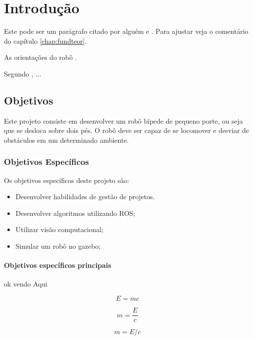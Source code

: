 \chapter{Introdução}
\label{chap:intro}

Este pode ser um parágrafo citado por alguém \cite{Barabasi2003-1} e \cite{barabasi2003linked}.
Para ajustar veja o comentário do capítulo \ref{chap:fundteor}.

As orientações do robô \cite{aperea-1}.

Segundo , ...

\section{Objetivos}
\label{sec:obj}
Este projeto consiste em desenvolver um robô bípede de pequeno porte, ou seja que se desloca sobre dois pés. O robô deve ser capaz de se locomover e desviar de obstáculos em um determinado ambiente. 

\subsection{Objetivos Específicos}
\label{ssec:objesp}
Os objetivos específicos deste projeto são:
\begin{itemize}
      \item Desenvolver habilidades de gestão de projetos.
      \item Desenvolver algoritmos utilizando ROS;
      \item Utilizar visão computacional;
      \item Simular um robô no gazebo;
  \end{itemize}

\subsubsection*{Objetivos específicos principais}
\label{sssec:obj-principais}
ok vendo Aqui


\begin{equation}
  E=mc
\end{equation}


\begin{equation*}
  m=\frac{E}{c}
\end{equation*}

\begin{equation}
  m=E/c
\end{equation}


